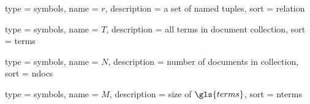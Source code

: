 {
	type = symbols,
	name = {\ensuremath{r}},
	description = {a set of named tuples},
	sort = relation
}

{
	type = symbols,
	name = {\ensuremath{T}},
	description = {all terms in document collection},
	sort = terms
}

{
	type = symbols,
	name = {\ensuremath{N}},
	description = {number of documents in collection},
	sort = ndocs
}

{
	type = symbols,
	name = {\ensuremath{M}},
	description = {size of $\gls{terms}$},
	sort = nterms
}